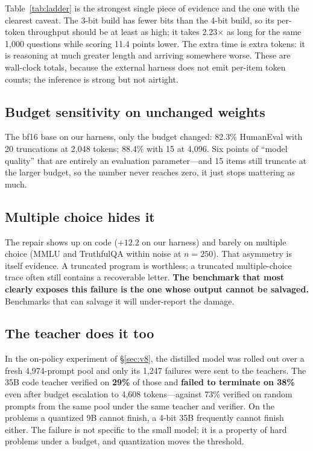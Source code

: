 \documentclass[11pt]{article}
\begin{document}
Table~\ref{tab:ladder} is the strongest single piece of evidence and the one
with the clearest caveat.  The 3-bit build has fewer bits than the 4-bit build,
so its per-token throughput should be at least as high; it takes 2.23$\times$
as long for the same 1{,}000 questions while scoring 11.4 points lower.  The
extra time is extra tokens: it is reasoning at much greater length and arriving
somewhere worse.  These are wall-clock totals, because the external harness
does not emit per-item token counts; the inference is strong but not airtight.

\subsection{Budget sensitivity on unchanged weights}

The bf16 base on our harness, only the budget changed: 82.3\% HumanEval with 20
truncations at 2{,}048 tokens; 88.4\% with 15 at 4{,}096.  Six points of
``model quality'' that are entirely an evaluation parameter---and 15 items
still truncate at the larger budget, so the number never reaches zero, it just
stops mattering as much.

\subsection{Multiple choice hides it}

The repair shows up on code ($+12.2$ on our harness) and barely on multiple
choice (MMLU and TruthfulQA within noise at $n=250$).  That asymmetry is itself
evidence.  A truncated program is worthless; a truncated multiple-choice trace
often still contains a recoverable letter.  \textbf{The benchmark that most
clearly exposes this failure is the one whose output cannot be salvaged.}
Benchmarks that can salvage it will under-report the damage.

\subsection{The teacher does it too}
\label{sec:teacher-termination}

In the on-policy experiment of \S\ref{sec:v8}, the distilled model was rolled
out over a fresh 4{,}974-prompt pool and only its 1{,}247 failures were sent to
the teachers.  The 35B code teacher verified on \textbf{29\%} of those and
\textbf{failed to terminate on 38\%} even after budget escalation to 4{,}608
tokens---against 73\% verified on random prompts from the same pool under the
same teacher and verifier.  On the problems a quantized 9B cannot finish, a
4-bit 35B frequently cannot finish either.  The failure is not specific to the
small model; it is a property of hard problems under a budget, and
quantization moves the threshold.
\end{document}
